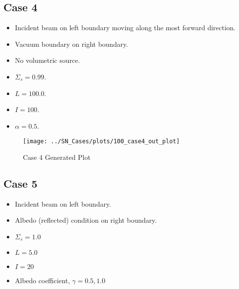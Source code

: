 \documentclass{NE515}
\theoremstyle{definition}
\begin{document}
    \subsection{Case 4}
    \begin{itemize}
        \item Incident beam on left boundary moving along the most forward direction.
        \item Vacuum boundary on right boundary.
        \item No volumetric source.
        \item $\Sigma_s=0.99$.
        \item $L=100.0$.
        \item $I=100$.
        \item $\alpha=0.5$.
    \end{itemize}

    \begin{figure}[!htb]
        \centering
        \texttt{[image: ../SN\_Cases/plots/100\_case4\_out\_plot]}
        \caption{Case 4 Generated Plot}
        \label{fig:case-4}
    \end{figure}

    \subsection{Case 5}
    \begin{itemize}
        \item Incident beam on left boundary.
        \item Albedo (reflected) condition on right boundary.
        \item $\Sigma_s=1.0$
        \item $L=5.0$
        \item $I=20$
        \item Albedo coefficient, $\gamma=0.5,1.0$
    \end{itemize}
\end{document}
